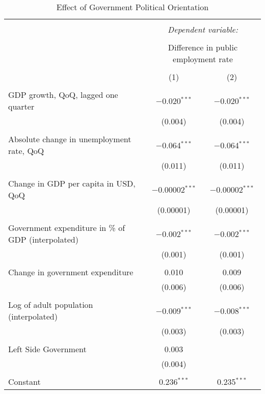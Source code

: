 
\begin{table}[!htbp] \centering 
  \caption{Effect of Government Political Orientation} 
  \label{} 
\begin{tabular}{@{\extracolsep{5pt}}lcc} 
\\[-1.8ex]\hline 
\hline \\[-1.8ex] 
 & \multicolumn{2}{c}{\textit{Dependent variable:}} \\ 
\cline{2-3} 
\\[-1.8ex] & \multicolumn{2}{c}{Difference in public employment rate} \\ 
\\[-1.8ex] & (1) & (2)\\ 
\hline \\[-1.8ex] 
 GDP growth, QoQ, lagged one quarter & $-$0.020$^{***}$ & $-$0.020$^{***}$ \\ 
  & (0.004) & (0.004) \\ 
  & & \\ 
 Absolute change in unemployment rate, QoQ & $-$0.064$^{***}$ & $-$0.064$^{***}$ \\ 
  & (0.011) & (0.011) \\ 
  & & \\ 
 Change in GDP per capita in USD, QoQ & $-$0.00002$^{***}$ & $-$0.00002$^{***}$ \\ 
  & (0.00001) & (0.00001) \\ 
  & & \\ 
 Government expenditure in \% of GDP (interpolated) & $-$0.002$^{***}$ & $-$0.002$^{***}$ \\ 
  & (0.001) & (0.001) \\ 
  & & \\ 
 Change in government expenditure & 0.010 & 0.009 \\ 
  & (0.006) & (0.006) \\ 
  & & \\ 
 Log of adult population (interpolated) & $-$0.009$^{***}$ & $-$0.008$^{***}$ \\ 
  & (0.003) & (0.003) \\ 
  & & \\ 
 Left Side Government & 0.003 &  \\ 
  & (0.004) &  \\ 
  & & \\ 
 Constant & 0.236$^{***}$ & 0.235$^{***}$ \\ 

\end{tabular}
\end{table}
